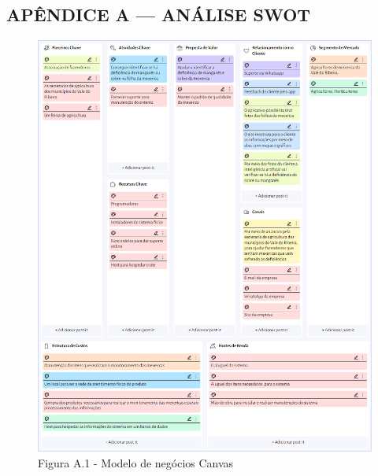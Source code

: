 
\begin{Appendix}

    \section{APÊNDICE A — ANÁLISE SWOT}%
    \label{sect:apx-a1}
    
    \begin{figure}[H]
    \centering
    \caption{Figura A.1 -  Modelo de negócios Canvas}%
    \label{fig:canvaspi}
    \includegraphics[width=0.8\linewidth]{Illustrations/canvas.png}
    \end{figure}
    
\end{Appendix}
    
    
\printindex%
    